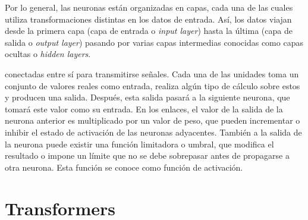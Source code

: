 \documentclass[11pt,spanish,listoffigures,listoftables]{tfgetsinf}
\begin{document}
Por lo general, las neuronas están organizadas en capas, cada una de las cuales utiliza transformaciones distintas en los datos de entrada. Así, los datos viajan desde la primera capa (capa de entrada o \textit{input layer}) hasta la última (capa de salida o \textit{output layer}) pasando por varias capas intermedias conocidas como capas ocultas o \textit{hidden layers}.

 conectadas entre sí para transmitirse señales. Cada una de las unidades toma un conjunto de valores reales como entrada, realiza algún tipo de cálculo sobre estos y producen una salida. Después, esta salida pasará a la siguiente neurona, que tomará este valor como su entrada. En los enlaces, el valor de la salida de la neurona anterior es multiplicado por un valor de peso, que pueden incrementar o inhibir el estado de activación de las neuronas adyacentes. También a la salida de la neurona puede existir una función limitadora o umbral, que modifica el resultado o impone un límite que no se debe sobrepasar antes de propagarse a otra neurona. Esta función se conoce como función de activación.




\section{Transformers}




\end{document}
